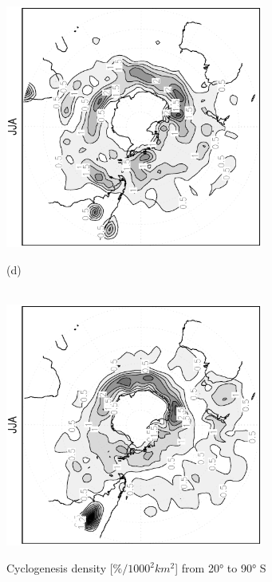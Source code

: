 \documentclass[12pt,a4paper,twoside,openright,headinclude,liststotoc,bibtotoc]{scrreprt}
\begin{document}
\begin{appendix}
\begin{figure}[c]
{\includegraphics[height=8.0cm,angle=-90]
{eps/cyclgen_PLASIM_T21_45JJA_SH.eps}
}
\parbox{8.5cm}{\hspace{0.95cm}\begin{scriptsize}(d)\end{scriptsize} \vspace{-0.5cm} \\
\includegraphics[height=8.0cm,angle=-90]
{eps/cyclgen_ERA40_T21_45JJA_SH.eps}
}
\caption[Cyclogenesis density Southern Hemisphere]{Cyclogenesis density [$\%/1000^2 km^2$] from 20° to 90° S}
\label{img:SHcyclgen}
\end{figure}



\end{appendix}
\end{document}
